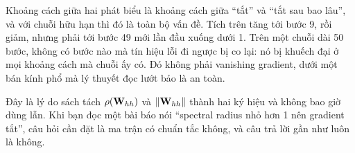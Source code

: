 Khoảng cách giữa hai phát biểu là khoảng cách giữa \enquote{tắt} và
\enquote{tắt sau bao lâu}, và với chuỗi hữu hạn thì đó là toàn bộ vấn đề. Tích
trên tăng tới bước 9, rồi giảm, nhưng phải tới bước 49 mới lần đầu xuống dưới 1.
Trên một chuỗi dài 50 bước, không có bước nào mà tín hiệu lỗi đi ngược bị co
lại: nó bị khuếch đại ở mọi khoảng cách mà chuỗi ấy có. Đó không phải vanishing
gradient, dưới một bán kính phổ mà lý thuyết đọc lướt bảo là an toàn.

Đây là lý do sách tách \(\rho(\mathbf{W}_{hh})\) và \(\lVert \mathbf{W}_{hh} \rVert\) thành
hai ký hiệu và không bao giờ dùng lẫn. Khi bạn đọc một bài báo nói
\enquote{spectral radius nhỏ hơn 1 nên gradient tắt}, câu hỏi cần đặt là ma
trận có chuẩn tắc không, và câu trả lời gần như luôn là không.
